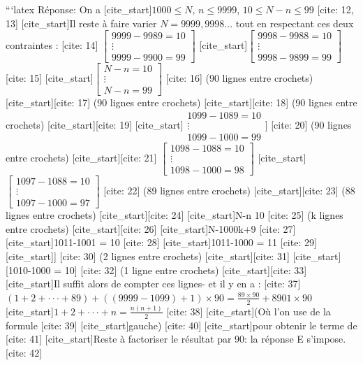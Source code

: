 ```latex
Réponse: On a
[cite_start]$1000\le N$, $n\le9999$, $10\le N-n\le99$ [cite: 12, 13]
[cite_start]Il reste à faire varier $N=9999,9998...$ tout en respectant ces deux contraintes : [cite: 14]
$[\begin{matrix}9999-9989=10\\ \vdots\\ 9999-9900=99\end{matrix}]$
[cite_start]$[\begin{matrix}9998-9988=10\\ \vdots\\ 9998-9899=99\end{matrix}]$ [cite: 15]
[cite_start]$[\begin{matrix}N-n=10\\ \vdots\\ N-n=99\end{matrix}]$ [cite: 16]
(90 lignes entre crochets) [cite_start][cite: 17]
(90 lignes entre crochets) [cite_start][cite: 18]
(90 lignes entre crochets) [cite_start][cite: 19]
[cite_start]$\begin{matrix}1099-1089=10\\ \vdots\\ 1099-1000=99\end{matrix}]$ [cite: 20]
(90 lignes entre crochets) [cite_start][cite: 21]
$[\begin{matrix}1098-1088=10\\ \vdots\\ 1098-1000=98\end{matrix}]$
[cite_start]$[\begin{matrix}1097-1088=10\\ \vdots\\ 1097-1000=97\end{matrix}]$ [cite: 22]
(89 lignes entre crochets) [cite_start][cite: 23]
(88 lignes entre crochets) [cite_start][cite: 24]
[cite_start]N-n 10 [cite: 25]
(k lignes entre crochets) [cite_start][cite: 26]
[cite_start]N-1000k+9 [cite: 27]
[cite_start]1011-1001 = 10 [cite: 28]
[cite_start]1011-1000 = 11 [cite: 29]
[cite_start]] [cite: 30]
(2 lignes entre crochets) [cite_start][cite: 31]
[cite_start][1010-1000 = 10] [cite: 32]
(1 ligne entre crochets) [cite_start][cite: 33]
[cite_start]Il suffit alors de compter ces lignes- et il y en a : [cite: 37]
$(1+2+\cdot\cdot\cdot+89)+((9999-1099)+1)\times90=\frac{89\times90}{2}+8901\times90$
[cite_start]$1+2+\cdot\cdot\cdot+n=\frac{n(n+1)}{2}$ [cite: 38]
[cite_start](Où l'on use de la formule [cite: 39]
[cite_start]gauche) [cite: 40]
[cite_start]pour obtenir le terme de [cite: 41]
[cite_start]Reste à factoriser le résultat par 90: la réponse E s'impose. [cite: 42]

